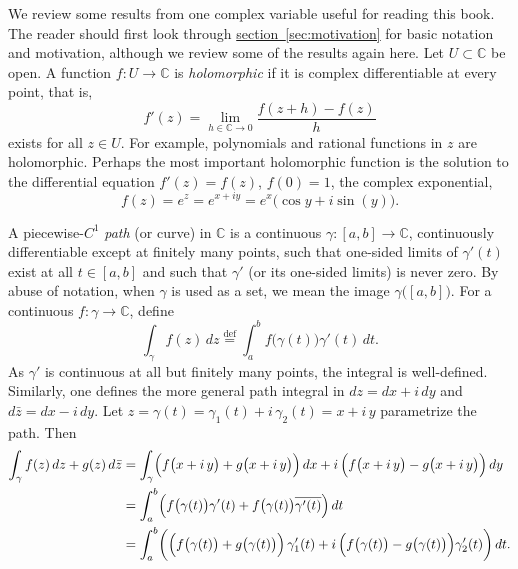 \documentclass[12pt,openany]{book}
\newcommand{\C}{{\mathbb{C}}}
\theoremstyle{plain}
\theoremstyle{remark}
\theoremstyle{definition}
\theoremstyle{exercise}
\theoremstyle{example}
\newcommand{\sectionref}[1]{\hyperref[#1]{section~\ref*{#1}}}
\begin{document}
We review some results from one complex variable useful for
reading this book.
The reader should first look through \sectionref{sec:motivation}
for basic notation and motivation, although we review some of the
results again here.
Let $U \subset \C$ be open.
A function
$f \colon U \to \C$ is \emph{holomorphic} if it is complex
differentiable at every point, that is,
\begin{equation*}
f'(z) = \lim_{h \in \C \to 0} \frac{f(z+h) - f(z)}{h}
\end{equation*}
exists for all $z \in U$.  For example, polynomials and rational
functions in $z$ are holomorphic.  Perhaps the most important holomorphic
function is the solution to the differential equation $f'(z) = f(z)$, $f(0) = 1$,
the complex exponential,
\begin{equation*}
f(z) = e^z = e^{x+iy} = e^x \bigl( \cos y + i \sin(y) \bigr) .
\end{equation*}


A piecewise-$C^1$ \emph{path} (or curve) in $\C$
is a continuous $\gamma \colon [a,b] \to \C$,
continuously differentiable except at finitely many points,
such that one-sided limits of $\gamma'(t)$ exist at all $t \in [a,b]$
and such that $\gamma'$ (or its one-sided limits) is never zero.
By abuse of notation, when $\gamma$ is used as a set, we mean
the image
$\gamma\bigl([a,b]\bigr)$.
For a continuous $f \colon \gamma \to \C$, define
%
\begin{equation*}
\int_\gamma f(z) \, dz
\overset{\text{def}}{=}
\int_a^b f\bigl(\gamma(t)\bigr) \gamma'(t) \, dt .
\end{equation*}
As $\gamma'$ is continuous at all but finitely many points,
the integral is well-defined.  Similarly, one defines the more general
path integral in $dz = dx + i\,dy$ and $d\bar{z} = dx - i\, dy$.
Let
$z = \gamma(t) = \gamma_1(t) + i \, \gamma_2(t) = x + i\, y$
parametrize the path.  Then
\begin{equation*}
\begin{split}
\int_\gamma f(z) \, dz + g(z) \, d\bar{z}
& =
\int_\gamma
\Bigl(f\bigl(x+i\, y\bigr) + g\bigl(x+i\, y\bigr) \Bigr) \, dx
+
i \, \Bigl( f\bigl(x+i\, y\bigr) - g\bigl(x+i\, y\bigr) \Bigr) \, dy
\\
& =
\int_a^b
\Bigl(
f\bigl(\gamma(t)\bigr) \gamma'(t)
+
f\bigl(\gamma(t)\bigr) \overline{\gamma'(t)}
\Bigr) \, dt
\\
& =
\int_a^b
\biggl(
\Bigl(f\bigl(\gamma(t)\bigr) + g\bigl(\gamma(t)\bigr) \Bigr) \,
\gamma_1'(t)
+
i \, \Bigl( f\bigl(\gamma(t)\bigr) - g\bigl(\gamma(t)\bigr) \Bigr)
\gamma_2'(t)
\biggr)
\, dt .
\end{split}
\end{equation*}
\end{document}
